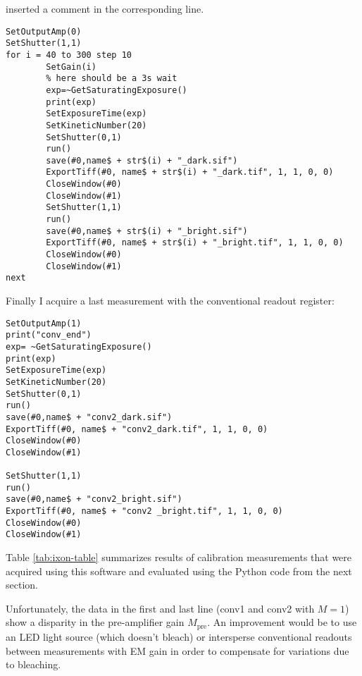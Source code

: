 inserted a comment in the corresponding line.
\begin{lstlisting}[style=mybasic]
SetOutputAmp(0)
SetShutter(1,1)
for i = 40 to 300 step 10
        SetGain(i)
        % here should be a 3s wait
        exp=~GetSaturatingExposure()
        print(exp)
        SetExposureTime(exp)
        SetKineticNumber(20)
        SetShutter(0,1)
        run()
        save(#0,name$ + str$(i) + "_dark.sif")
        ExportTiff(#0, name$ + str$(i) + "_dark.tif", 1, 1, 0, 0)
        CloseWindow(#0)
        CloseWindow(#1)
        SetShutter(1,1)
        run()
        save(#0,name$ + str$(i) + "_bright.sif")
        ExportTiff(#0, name$ + str$(i) + "_bright.tif", 1, 1, 0, 0)
        CloseWindow(#0)
        CloseWindow(#1)
next
\end{lstlisting}
Finally I acquire a last measurement with the conventional readout
register: \begin{lstlisting}[style=mybasic]
SetOutputAmp(1)
print("conv_end")
exp= ~GetSaturatingExposure()
print(exp)
SetExposureTime(exp)
SetKineticNumber(20)
SetShutter(0,1)
run()
save(#0,name$ + "conv2_dark.sif")
ExportTiff(#0, name$ + "conv2_dark.tif", 1, 1, 0, 0)
CloseWindow(#0)
CloseWindow(#1)
        
SetShutter(1,1)
run()
save(#0,name$ + "conv2_bright.sif")
ExportTiff(#0, name$ + "conv2 _bright.tif", 1, 1, 0, 0)
CloseWindow(#0)
CloseWindow(#1)
\end{lstlisting}
Table \ref{tab:ixon-table} summarizes results of calibration
measurements that were acquired using this software and evaluated
using the Python code from the next section.

Unfortunately, the data in the first and last line (conv1 and conv2
with $M=1$) show a disparity in the pre-amplifier gain
$M_\textrm{pre}$. An improvement would be to use an LED light source
(which doesn't bleach) or intersperse conventional readouts between
measurements with EM gain in order to compensate for variations due to
bleaching.


